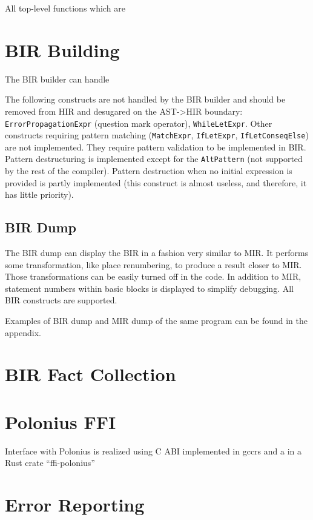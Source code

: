 \documentclass[
  11pt,
]{report}
\begin{document}
All top-level functions which are

\section{BIR Building}\label{bir-building-1}

The BIR builder can handle

The following constructs are not handled by the BIR builder and should
be removed from HIR and desugared on the AST-\textgreater HIR boundary:
\texttt{ErrorPropagationExpr} (question mark operator),
\texttt{WhileLetExpr}. Other constructs requiring pattern matching
(\texttt{MatchExpr}, \texttt{IfLetExpr}, \texttt{IfLetConseqElse}) are
not implemented. They require pattern validation to be implemented in
BIR. Pattern destructuring is implemented except for the
\texttt{AltPattern} (not supported by the rest of the compiler). Pattern
destruction when no initial expression is provided is partly implemented
(this construct is almost useless, and therefore, it has little
priority).

\subsection{BIR Dump}\label{bir-dump}

The BIR dump can display the BIR in a fashion very similar to MIR. It
performs some transformation, like place renumbering, to produce a
result closer to MIR. Those transformations can be easily turned off in
the code. In addition to MIR, statement numbers within basic blocks is
displayed to simplify debugging. All BIR constructs are supported.

Examples of BIR dump and MIR dump of the same program can be found in
the appendix.

\section{BIR Fact Collection}\label{bir-fact-collection}

\section{Polonius FFI}\label{polonius-ffi}

Interface with Polonius is realized using C ABI implemented in gccrs and
a in a Rust crate ``ffi-polonius''

\section{Error Reporting}\label{error-reporting-1}
\end{document}
